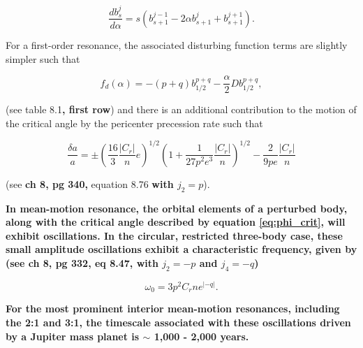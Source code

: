 \documentclass[fleqn,usenatbib]{mnras}
\begin{document}
\begin{equation}\label{eq:lap_d}
	\frac{d b_{s}^{j}}{d \alpha} = s \left( b_{s+1}^{j-1} - 2 \alpha b_{s+1}^{j} + b_{s+1}^{j+1} \right).
\end{equation}

For a first-order resonance, the associated disturbing function terms are slightly simpler such that

\begin{equation}\label{eq:fd_fo}
	f_{d}(\alpha) = -(p+q) b_{1/2}^{p+q} - \frac{\alpha}{2} D b_{1/2}^{p+q},
\end{equation}

\noindent (see \citet{1999ssd..book.....M} table 8.1\textbf{, first row}) and there is an additional contribution to the motion of the critical angle by the pericenter precession rate such that

\begin{equation}\label{eq:res_fo}
	\frac{\delta a}{a} = \pm \left(\frac{16}{3} \frac{\left| C_{r} \right|}{n} e \right)^{1/2} \left(  1 + \frac{1}{27 p^2 e^3} \frac{\left| C_{r} \right|}{n} 
	\right)^{1/2} - \frac{2}{9 p e}  \frac{\left| C_{r} \right|}{n}
\end{equation}

\noindent (see \citet{1999ssd..book.....M} \textbf{ch 8, pg 340,} equation 8.76 \textbf{with $j_{2} = p$}).

\textbf{In mean-motion resonance, the orbital elements of a perturbed body, along with the critical angle described by equation \ref{eq:phi_crit}, will exhibit oscillations. In the circular, restricted three-body case, these small amplitude oscillations exhibit a characteristic frequency, given by (see \citet{1999ssd..book.....M} ch 8, pg 332, eq 8.47, with $j_{2} =-p$ and $j_{4} = -q$)}

\begin{equation}\label{eq:lib_time}
	\omega_{0} = 3 p^{2} C_{r} n e^{\left| -q \right|}.
\end{equation}

\noindent \textbf{For the most prominent interior mean-motion resonances, including the 2:1 and 3:1, the timescale associated with these oscillations driven by a Jupiter mass planet is  $\sim$ 1,000 - 2,000 years.}


\end{document}

